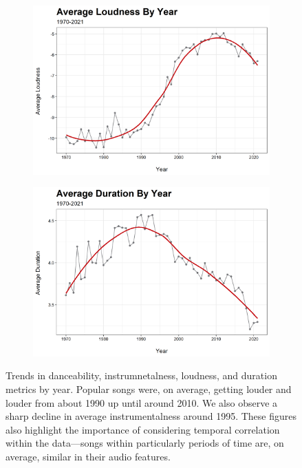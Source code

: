 \documentclass[12pt, twoside]{article}
\begin{document}
\begin{figure}[H]
\begin{subfigure}[b]{0.5\textwidth}
\includegraphics[width = \textwidth]{track_loudness_trend_.png}
\caption{}
\label{fig:loudness_trend}
\end{subfigure}
\begin{subfigure}[b]{0.5\textwidth}
\centering
\includegraphics[width = \textwidth]{track_duration_trend_.png}
\caption{}
\label{fig:duration_trend}
\end{subfigure}
\caption{Trends in danceability, instrumnetalness, loudness, and duration metrics by year. Popular songs were, on average, getting louder and louder from about 1990 up until around 2010. We also observe a sharp decline in average instrumentalness around 1995. These figures also highlight the importance of considering temporal correlation within the data---songs within particularly periods of time are, on average, similar in their audio features.}
\label{fig:multipart_figure}
\end{figure}
\end{document}
